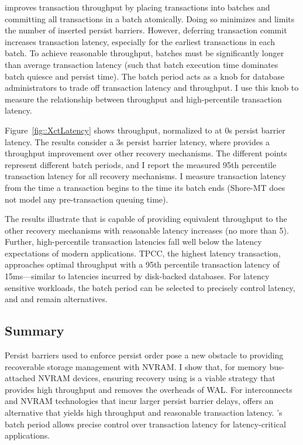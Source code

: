 

\GroupCommit improves transaction throughput by placing transactions into batches and committing all transactions in a batch atomically.
Doing so minimizes and limits the number of inserted persist barriers.
However, deferring transaction commit increases transaction latency, especially for the earliest transactions in each batch.
To achieve reasonable throughput, batches must be significantly longer than average transaction latency (such that batch execution time dominates batch quiesce and persist time).
The batch period acts as a knob for database administrators to trade off transaction latency and throughput.
I use this knob to measure the relationship between throughput and high-percentile transaction latency.

Figure~\ref{fig::XctLatency} shows throughput, normalized to \InPlace at 0\textmu s persist barrier latency.
The results consider a 3\textmu s persist barrier latency, where \GroupCommit provides a throughput improvement over other recovery mechanisms.
The different \GroupCommit points represent different batch periods, and I report the measured 95th percentile transaction latency for all recovery mechanisms.
I measure transaction latency from the time a transaction begins to the time its batch ends (Shore-MT does not model any pre-transaction queuing time).

The results illustrate that \GroupCommit is capable of providing equivalent throughput to the other recovery mechanisms with reasonable latency increases (no more than 5\texttimes).
Further, high-percentile transaction latencies fall well below the latency expectations of modern applications.
TPCC, the highest latency transaction, approaches optimal throughput with a 95th percentile transaction latency of 15ms---similar to latencies incurred by disk-backed databases.
For latency sensitive workloads, the batch period can be selected to precisely control latency, and \InPlace and \NVDisk remain alternatives.

\subsection{Summary}
\label{sec:OLTP_eval:Persists:Summary}
Persist barriers used to enforce persist order pose a new obstacle to providing recoverable storage management with NVRAM.
I show that, for memory bus-attached NVRAM devices, ensuring recovery using \InPlace is a viable strategy that provides high throughput and removes the overheads of WAL.
For interconnects and NVRAM technologies that incur larger persist barrier delays, \GroupCommit offers an alternative that yields high throughput and reasonable transaction latency.
\GroupCommit's batch period allows precise control over transaction latency for latency-critical applications.

